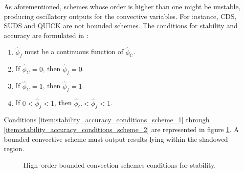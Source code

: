 As aforementioned, schemes whose order is higher than one might be unstable, producing oscillatory outputs for the convective variables. For instance, CDS, SUDS and QUICK are not bounded schemes. The conditions for stability and accuracy are formulated in \cite{gaskell1988curvature}:
\begin{enumerate}[label=(\roman*),topsep=0pt]
	\item $\hat{\phi}_f$ must be a continuous function of $\hat{\phi}_C$. \label{item:stability_accuracy_conditions_scheme_1}
	\item If $\hat{\phi}_C = 0$, then $\hat{\phi}_f = 0$.
	\item If $\hat{\phi}_C = 1$, then $\hat{\phi}_f = 1$.
	\item If $0 < \hat{\phi}_f < 1$, then $\hat{\phi}_C < \hat{\phi}_f < 1$.\label{item:stability_accuracy_conditions_scheme_2}
\end{enumerate}
Conditions \ref{item:stability_accuracy_conditions_scheme_1} through \ref{item:stability_accuracy_conditions_scheme_2} are represented in figure \ref{fig:stability_accuracy_conditions_scheme}. A bounded convective scheme must output results lying within the shadowed region.

\begin{figure}[h]
	\centering
	\captionsetup{width=0.5\textwidth}
	\caption{High--order bounded convection schemes conditions for stability.}
	\label{fig:stability_accuracy_conditions_scheme}
\end{figure}

